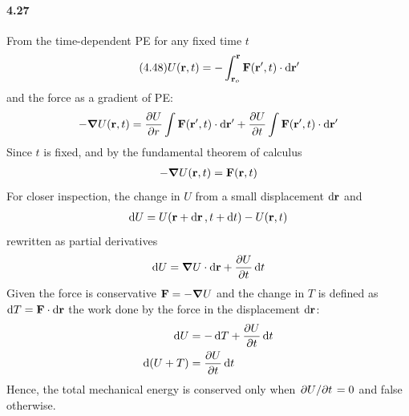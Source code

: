 \documentclass[../problems.tex]{subfiles}
\begin{document}
\paragraph{4.27}
From the time-dependent PE for any fixed time $t$
\begin{equation*} \tag{4.48}
    U(\vb{r}, t) = -\int_{\vb{r}_o}^{\vb{r}} \vb{F}(\vb{r}', t) \cdot \dd{\vb{r}'}
\end{equation*}
and the force as a gradient of PE:
\begin{align*}
    -\grad{U}(\vb{r}, t) &= \pdv{U}{r} \int \vb{F}(\vb{r}', t) \cdot \dd{\vb{r}'}
        + \pdv{U}{t} \int \vb{F}(\vb{r}', t) \cdot \dd{\vb{r}'} \\
\end{align*}
Since $t$ is fixed, and by the fundamental theorem of calculus
\begin{align*}
    -\grad{U}(\vb{r}, t) = \vb{F}(\vb{r}, t)
\end{align*}
For closer inspection, the change in $U$ from a small displacement $\dd{\vb{r}}$  and 
\begin{align*}
    \dd{U} = U(\vb{r} + \dd{\vb{r}}, t + \dd{t}) - U(\vb{r}, t)
\end{align*}
rewritten as partial derivatives
\begin{align*}
    \dd{U} = \grad{U} \cdot \dd{\vb{r}} + \pdv{U}{t} \dd{t}
\end{align*}
Given the force is conservative $\vb{F} = -\grad{U}$ and the change in $T$ is defined as
$\dd{T} = \vb{F} \cdot \dd{\vb{r}}$ the work done by the force in the displacement $\dd{\vb{r}}$:
\begin{align*}
    \dd{U} &= -\dd{T} + \pdv{U}{t} \dd{t} \\
    \dd(U + T) &= \pdv{U}{t} \dd{t}
\end{align*}
Hence, the total mechanical energy is conserved only when $\pdv*{U}{t} = 0$ and false otherwise.
\end{document}
